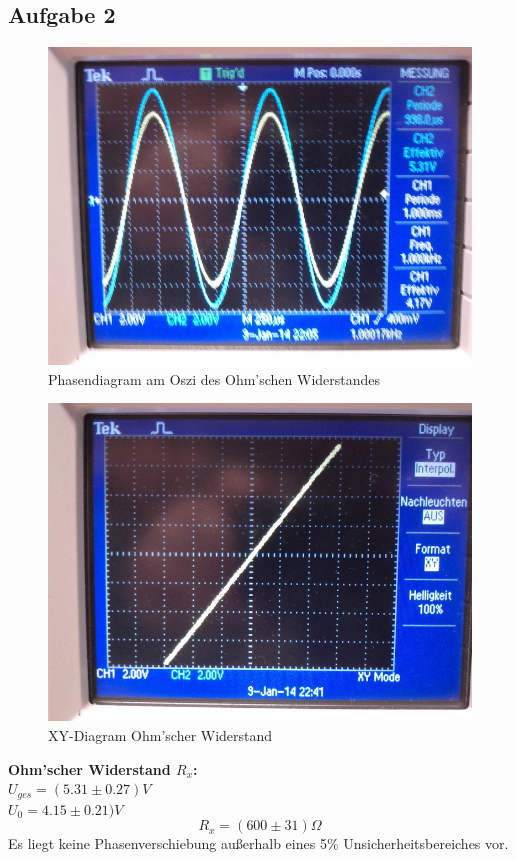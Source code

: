 \documentclass[12pt,a4paper]{article}
\begin{document}
\begin{multicols}{2}
\subsection{Aufgabe 2}
\begin{figure}[H]
	\centering
	\includegraphics[scale=0.25]{./figure/1kHz_Oszi_RX.jpg}
	\caption{Phasendiagram am Oszi des Ohm'schen Widerstandes}
	\label{fig:phase_rx}
\end{figure}
\begin{figure}[H]
	\centering
	\includegraphics[scale=0.25]{./figure/xy_ohm.jpg}
	\caption{XY-Diagram Ohm'scher Widerstand}
	\label{fig:xy_rx}
\end{figure}
\textbf{Ohm'scher Widerstand $R_x$:}\\
$U_{ges} = (5.31 \pm 0.27)V$\\
$U_0 = 4.15 \pm 0.21)V$\\
$$R_x=(600 \pm 31)\Omega$$
Es liegt keine Phasenverschiebung außerhalb eines 5\% Unsicherheitsbereiches vor.


\end{multicols}
\end{document}
